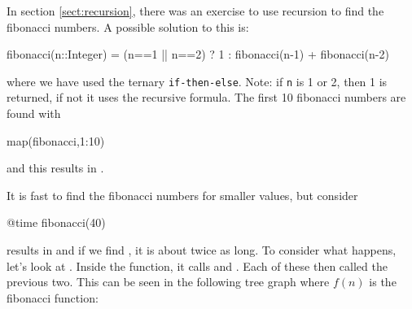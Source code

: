In section \ref{sect:recursion}, there was an exercise to use recursion to find the fibonacci numbers.  A possible solution to this is:
\begin{jlblock}[fibonacci]
fibonacci(n::Integer) = (n==1 || n==2) ? 1 : fibonacci(n-1) + fibonacci(n-2)
\end{jlblock}
where we have used the ternary \texttt{if-then-else}.  Note: if \texttt{n} is 1 or 2, then 1 is returned, if not it uses the recursive formula.  The first 10 fibonacci numbers are found with
\begin{jlblock}[fibonacci]
map(fibonacci,1:10)
\end{jlblock}
and this results in  \printpythontex[verb].

It is fast to find the fibonacci numbers for smaller values, but consider
\begin{jlblock}[fibonacci]
@time fibonacci(40)
\end{jlblock}
results in  \printpythontex[verbatim]
%
and if we find , it is about twice as long.   To consider what happens, let's look at .  Inside the function, it calls  and .  Each of these then called the previous two.  This can be seen in the following tree graph where $f(n)$ is the fibonacci function:
\begin{center}
\end{center}

